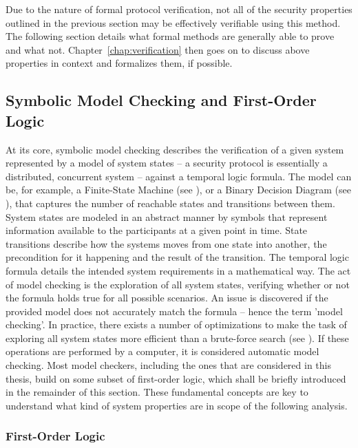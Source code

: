 Due to the nature of formal protocol verification, not all of the security properties outlined in the previous section may be effectively verifiable using this method.
The following section details what formal methods are generally able to prove and what not.
Chapter~\ref{chap:verification} then goes on to discuss above properties in context and formalizes them, if possible.

\subsection{Symbolic Model Checking and First-Order Logic}
\label{ssec:symbolic}

At its core, symbolic model checking describes the verification of a given system represented by a model of system states – a security protocol is essentially a distributed, concurrent system – against a temporal logic formula.
The model can be, for example, a Finite-State Machine (see \cite{alur1998model}), or a Binary Decision Diagram (see \cite{burch1992symbolic}), that captures the number of reachable states and transitions between them.
System states are modeled in an abstract manner by symbols that represent information available to the participants at a given point in time.
State transitions describe how the systems moves from one state into another, the precondition for it happening and the result of the transition.
The temporal logic formula details the intended system requirements in a mathematical way.
The act of model checking is the exploration of all system states, verifying whether or not the formula holds true for all possible scenarios.
An issue is discovered if the provided model does not accurately match the formula – hence the term 'model checking'.
In practice, there exists a number of optimizations to make the task of exploring all system states more efficient than a brute-force search (see \cite{etessami2000optimizing}).
If these operations are performed by a computer, it is considered automatic model checking.
Most model checkers, including the ones that are considered in this thesis, build on some subset of first-order logic, which shall be briefly introduced in the remainder of this section.
These fundamental concepts are key to understand what kind of system properties are in scope of the following analysis.

\subsubsection{First-Order Logic}

